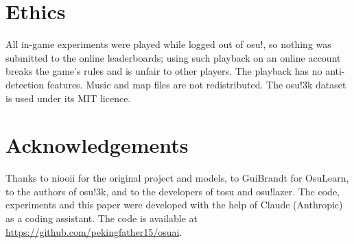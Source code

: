 \documentclass[11pt,a4paper]{article}
\begin{document}
\section{Ethics}
All in-game experiments were played while logged out of osu!, so nothing was submitted to the online
leaderboards; using such playback on an online account breaks the game's rules and is unfair to other
players. The playback has no anti-detection features. Music and map files are not redistributed. The osu!3k
dataset is used under its MIT licence.

\section*{Acknowledgements}
Thanks to niooii for the original project and models, to GuiBrandt for OsuLearn, to the authors of osu!3k, and
to the developers of tosu and osu!lazer. The code, experiments and this paper were developed with the help of
Claude (Anthropic) as a coding assistant. The code is available at
\url{https://github.com/pekingfather15/osuai}.

\newpage
\renewcommand{\refname}{References}

\end{document}
